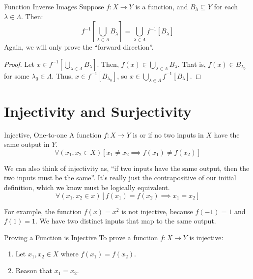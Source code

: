 \begin{exbox}{Function Inverse Images}{}
    Suppose $f : X \to Y$ is a function, and $B_\lambda \subseteq Y$ for each $\lambda \in \Lambda$. Then:
    \[ f^{-1} \left[ \bigcup_{\lambda \in \Lambda} B_\lambda \right] = \bigcup_{\lambda \in \Lambda} f^{-1} \left[ B_\lambda \right] \]
    \tcblower
    Again, we will only prove the ``forward direction''.
    \begin{proof}
        Let $x \in f^{-1} \left[ \bigcup_{\lambda \in \Lambda} B_\lambda \right]$. Then, $f(x) \in \bigcup_{\lambda \in \Lambda} B_\lambda$. That is, $f(x) \in B_{\lambda_0}$ for some $\lambda_0 \in \Lambda$. Thus, $x \in f^{-1} \left[ B_{\lambda_0} \right]$, so $x \in \bigcup_{\lambda \in \Lambda} f^{-1} \left[ B_\lambda \right]$.
    \end{proof}
\end{exbox}

\section{Injectivity and Surjectivity}

\begin{dfnbox}{Injective, One-to-one}{}
    A function $f : X \to Y$ is  or  if no two inputs in $X$ have the same output in $Y$.
    \tcblower
    \[ \forall (x_1, x_2 \in X) \left[ x_1 \neq x_2 \implies f\left(x_1\right) \neq f\left(x_2\right) \right] \]
\end{dfnbox}

We can also think of injectivity as, ``if two inputs have the same output, then the two inputs must be the same''. It's really just the contrapositive of our initial definition, which we know must be logically equivalent.
\[ \forall (x_1, x_2 \in x) \left[ f(x_1) = f(x_2) \implies x_1 = x_2 \right] \]

For example, the function $f(x) = x^2$ is not injective, because $f(-1) = 1$ and $f(1) = 1$. We have two distinct inputs that map to the same output.

\begin{tecbox}{Proving a Function is Injective}{}
    To prove a function $f : X \to Y$ is injective:
    \begin{enumerate}
        \item Let $x_1, x_2 \in X$ where $f(x_1) = f(x_2)$.
        \item Reason that $x_1 = x_2$.
    \end{enumerate}
\end{tecbox}

